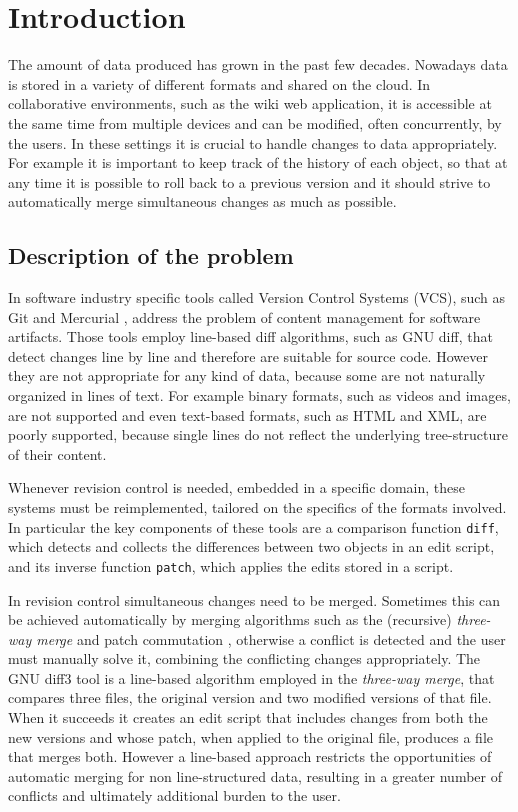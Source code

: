 \documentclass[../Thesis.tex]{subfiles}
\begin{document}
\chapter{Introduction}

The amount of data produced has grown in the past few decades.
Nowadays data is stored in a variety of different formats and shared on the cloud.
In collaborative environments, such as the wiki web application, it is accessible at the same time from multiple devices and can be modified, often concurrently, by the users.
In these settings it is crucial to handle changes to data appropriately.
For example it is important to keep track of the history
of each object, so that at any time it is possible to roll
back to a previous version and it should strive to automatically
merge simultaneous changes as much as possible.

	\section{Description of the problem}
	\label{sec:Problem}
	In software industry specific tools called Version Control Systems (VCS),
	such as Git \cite{GIT} and Mercurial \cite{Mercurial},
	address the problem of content management for software artifacts.
	Those tools employ line-based diff algorithms, such as GNU diff,
	that detect changes line by line and therefore are suitable 
	for source code. 
	However they are not appropriate for any kind of data, 
	because some are not naturally organized in lines of text.
	For example binary formats, such as videos and images, are not
	supported and even text-based formats, such as HTML and XML, 	
	are poorly supported, because single lines do not reflect 
	the underlying tree-structure of their content.
	
	Whenever revision control is needed, embedded in a specific 
	domain, these systems must be reimplemented, tailored on the specifics of 
	the formats 	involved.
	In particular the key components of these tools are a comparison function
	\texttt{diff}, which detects and collects the differences between two objects 
	in an edit script, and its inverse function \texttt{patch}, which applies 
	the edits stored in a script.	
	
	In revision control simultaneous changes need to be merged.
	Sometimes this can be achieved automatically by merging algorithms 
	such as the (recursive) \emph{three-way merge} and patch commutation 
	\cite{Darcs}, otherwise a 
	conflict is detected and the user must manually solve it, combining 
	the conflicting 	changes appropriately. 
	The GNU diff3 tool is a line-based algorithm employed in the
	\emph{three-way merge}, that compares three files, 
	the original version and two modified versions of that file.
	When it succeeds it creates an edit script that includes changes from 
	both the new versions and whose patch, when applied to the original file, 
	produces a file that merges both.
	However a line-based approach restricts
	the opportunities of automatic merging for non 
	line-structured data, resulting in a greater number of conflicts and 
	ultimately additional burden to the user.
\end{document}
